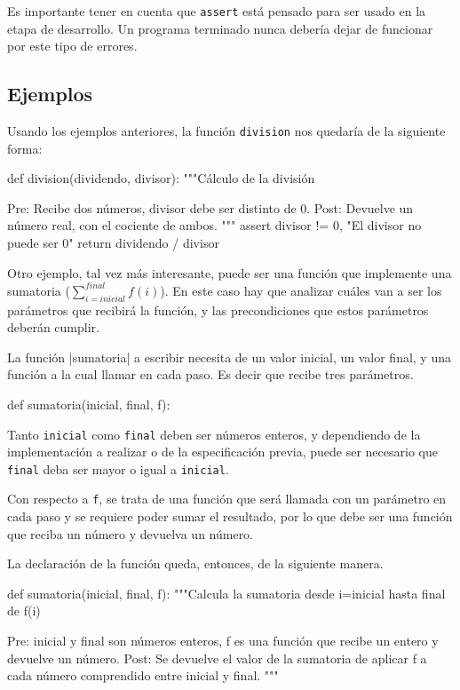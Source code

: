 \begin{atencion}
Es importante tener en cuenta que \lstinline!assert! está pensado para ser
usado en la etapa de desarrollo. Un programa terminado nunca debería dejar
de funcionar por este tipo de errores.
\end{atencion}

\subsection{Ejemplos}

Usando los ejemplos anteriores, la función \lstinline!division! nos
quedaría de la siguiente forma:

\begin{codigo-python-sn}
def division(dividendo, divisor):
    """Cálculo de la división

    Pre: Recibe dos números, divisor debe ser distinto de 0.
    Post: Devuelve un número real, con el cociente de ambos.
    """
    assert divisor != 0, "El divisor no puede ser 0"
    return dividendo / divisor
\end{codigo-python-sn}

Otro ejemplo, tal vez más interesante, puede ser una función que implemente
una sumatoria ($\sum_{i=inicial}^{final} f(i)$).  En este caso hay que
analizar cuáles van a ser los parámetros que recibirá la función, y las
precondiciones que estos parámetros deberán cumplir.

La función |sumatoria| a escribir necesita de un valor inicial, un valor
final, y una función a la cual llamar en cada paso. Es decir que recibe
tres parámetros.

\begin{codigo-python-sn}
def sumatoria(inicial, final, f):
\end{codigo-python-sn}

Tanto \lstinline!inicial! como \lstinline!final! deben ser números enteros,
y dependiendo de la implementación a realizar o de la especificación
previa, puede ser necesario que \lstinline!final! deba ser mayor o igual a
\lstinline!inicial!.

Con respecto a \lstinline!f!, se trata de una función que será llamada con
un parámetro en cada paso y se requiere poder sumar el resultado, por lo
que debe ser una función que reciba un número y devuelva un número.

La declaración de la función queda, entonces, de la siguiente manera.

\begin{codigo-python-sn}
def sumatoria(inicial, final, f):
    """Calcula la sumatoria desde i=inicial hasta final de f(i)

    Pre: inicial y final son números enteros, f es una función que
         recibe un entero y devuelve un número.
    Post: Se devuelve el valor de la sumatoria de aplicar f a cada
          número comprendido entre inicial y final.
    """
\end{codigo-python-sn}

